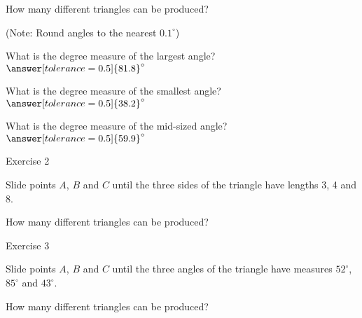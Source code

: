 \documentclass[number]{ximera}
\begin{document}
\begin{question}
How many different triangles can be produced?
\begin{multipleChoice}
\end{multipleChoice}

\begin{question}
(Note: Round angles to the nearest $0.1^\circ$)

What is the degree measure of the largest angle? $\answer[tolerance=0.5]{81.8}^\circ$

What is the degree measure of the smallest angle? $\answer[tolerance=0.5]{38.2}^\circ$

What is the degree measure of the mid-sized angle? $\answer[tolerance=0.5]{59.9}^\circ$
\end{question}
\end{question}

\bigskip

Exercise 2

Slide points $A$, $B$ and $C$ until the three sides of the triangle have lengths 3, 4 and 8. 

\begin{question}
How many different triangles can be produced?
\begin{multipleChoice}
\end{multipleChoice}

\end{question}

\bigskip

Exercise 3

Slide points $A$, $B$ and $C$ until the three angles of the triangle have measures $52^\circ$, $85^\circ$ and $43^\circ$. 

\begin{question}
How many different triangles can be produced?
\begin{multipleChoice}
\end{multipleChoice}

\end{question}
\end{document}

